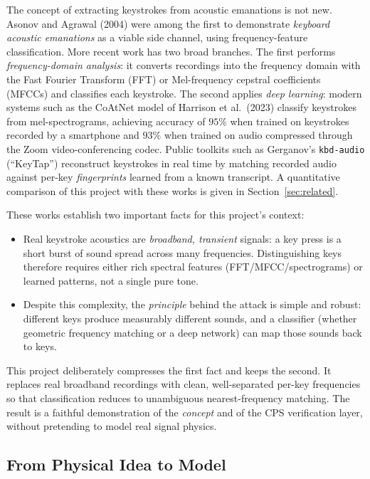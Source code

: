 \documentclass[11pt,a4paper]{article}
\begin{document}
The concept of extracting keystrokes from acoustic emanations is not new.
Asonov and Agrawal (2004) were among the first to demonstrate \emph{keyboard
acoustic emanations} as a viable side channel, using frequency-feature
classification. More recent work has two broad branches. The first performs
\emph{frequency-domain analysis}: it converts recordings into the frequency
domain with the Fast Fourier Transform (FFT) or Mel-frequency cepstral
coefficients (MFCCs) and classifies each keystroke. The second applies
\emph{deep learning}: modern systems such as the CoAtNet model of Harrison et
al.\ (2023) classify keystrokes from mel-spectrograms, achieving accuracy of
$95\%$ when trained on keystrokes recorded by a smartphone and $93\%$ when
trained on audio compressed through the Zoom video-conferencing codec. Public
toolkits such as Gerganov's \texttt{kbd-audio} (``KeyTap'') reconstruct
keystrokes in real time by matching recorded audio against per-key
\emph{fingerprints} learned from a known transcript. A quantitative comparison
of this project with these works is given in Section~\ref{sec:related}.

These works establish two important facts for this project's context:

\begin{itemize}
    \item Real keystroke acoustics are \emph{broadband, transient} signals:
          a key press is a short burst of sound spread across many
          frequencies. Distinguishing keys therefore requires either rich
          spectral features (FFT/MFCC/spectrograms) or learned patterns, not a
          single pure tone.
    \item Despite this complexity, the \emph{principle} behind the attack is
          simple and robust: different keys produce measurably different
          sounds, and a classifier (whether geometric frequency matching or a
          deep network) can map those sounds back to keys.
\end{itemize}

This project deliberately compresses the first fact and keeps the second. It
replaces real broadband recordings with clean, well-separated per-key
frequencies so that classification reduces to unambiguous nearest-frequency
matching. The result is a faithful demonstration of the \emph{concept} and of
the CPS verification layer, without pretending to model real signal physics.

\subsection{From Physical Idea to Model}
\end{document}
